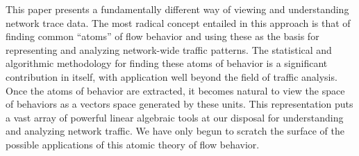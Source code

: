 \documentclass[conference]{IEEEtran}
\newcommand{\caps}[1]{{\small{#1}}}
\begin{document}
This paper presents a fundamentally different way of viewing and understanding network trace data. The most radical concept entailed in this approach is that of finding common ``atoms'' of flow behavior and using these as the basis for representing and analyzing network-wide traffic patterns. The statistical and algorithmic methodology for finding these atoms of behavior is a significant contribution in itself, with application well beyond the field of traffic analysis. Once the atoms of behavior are extracted, it becomes natural to view the space of behaviors as a vectors space generated by these units. This representation puts a vast array of powerful linear algebraic tools at our disposal for understanding and analyzing network traffic. We have only begun to scratch the surface of the possible applications of this atomic theory of flow behavior.


\end{document}
